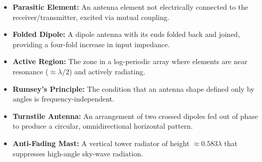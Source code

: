 \documentclass[12pt,a4paper]{article}
\begin{document}
\begin{tcolorbox}[defbox, title={\textbf{One-Line Definitions}}]
\begin{itemize}[leftmargin=*, itemsep=2pt, topsep=0pt]
  \item \textbf{Parasitic Element:} An antenna element not electrically connected to the receiver/transmitter, excited via mutual coupling.
  \item \textbf{Folded Dipole:} A dipole antenna with its ends folded back and joined, providing a four-fold increase in input impedance.
  \item \textbf{Active Region:} The zone in a log-periodic array where elements are near resonance ($\approx \lambda/2$) and actively radiating.
  \item \textbf{Rumsey's Principle:} The condition that an antenna shape defined only by angles is frequency-independent.
  \item \textbf{Turnstile Antenna:} An arrangement of two crossed dipoles fed out of phase to produce a circular, omnidirectional horizontal pattern.
  \item \textbf{Anti-Fading Mast:} A vertical tower radiator of height $\approx 0.583\lambda$ that suppresses high-angle sky-wave radiation.
\end{itemize}
\end{tcolorbox}
\end{document}
